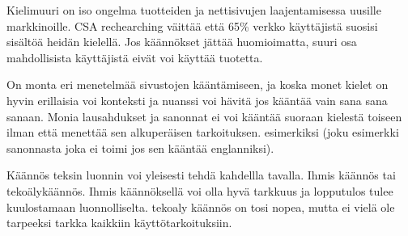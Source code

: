 \documentclass[11pt,a4paper,titlepage,oneside]{article}
\begin{document}




















Kielimuuri on iso ongelma tuotteiden ja nettisivujen laajentamisessa uusille markkinoille.
CSA rechearching väittää että 65\% verkko käyttäjistä suosisi sisältöä heidän kielellä.
Jos käännökset jättää huomioimatta, suuri osa mahdollisista käyttäjistä eivät voi käyttää tuotetta.
\medskip







On monta eri menetelmää sivustojen kääntämiseen, 
ja koska monet kielet on hyvin erillaisia voi konteksti ja nuanssi voi hävitä jos kääntää vain sana sana sanaan.
Monia lausahdukset ja sanonnat ei voi kääntää suoraan kielestä toiseen ilman että menettää sen alkuperäisen tarkoituksen. \citemissing
esimerkiksi (joku esimerkki sanonnasta joka ei toimi jos sen kääntää englanniksi).%
\medskip


Käännös teksin luonnin voi yleisesti tehdä kahdellla tavalla. Ihmis käännös tai tekoälykäännös.
Ihmis käännöksellä voi olla hyvä tarkkuus ja lopputulos tulee kuulostamaan luonnolliselta.
tekoaly käännös on tosi nopea, mutta ei vielä ole tarpeeksi tarkka kaikkiin käyttötarkoituksiin.\citemissing
\medskip
\end{document}

